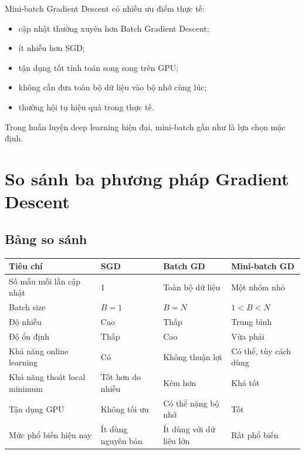 \documentclass[12pt,a4paper]{report}
\begin{document}
Mini-batch Gradient Descent có nhiều ưu điểm thực tế:

\begin{itemize}
    \item cập nhật thường xuyên hơn Batch Gradient Descent;
    \item ít nhiễu hơn SGD;
    \item tận dụng tốt tính toán song song trên GPU;
    \item không cần đưa toàn bộ dữ liệu vào bộ nhớ cùng lúc;
    \item thường hội tụ hiệu quả trong thực tế.
\end{itemize}

\begin{ghinho}
Trong huấn luyện deep learning hiện đại, mini-batch gần như là lựa chọn mặc định.
\end{ghinho}

\chapter{So sánh ba phương pháp Gradient Descent}

\section{Bảng so sánh}

\begin{center}
\begin{tabular}{p{}p{}p{}p{}}
\toprule
Tiêu chí & SGD & Batch GD & Mini-batch GD \\
\midrule
Số mẫu mỗi lần cập nhật & 1 & Toàn bộ dữ liệu & Một nhóm nhỏ \\
Batch size & $B=1$ & $B=N$ & $1<B<N$ \\
Độ nhiễu & Cao & Thấp & Trung bình \\
Độ ổn định & Thấp & Cao & Vừa phải \\
Khả năng online learning & Có & Không thuận lợi & Có thể, tùy cách dùng \\
Khả năng thoát local minimum & Tốt hơn do nhiễu & Kém hơn & Khá tốt \\
Tận dụng GPU & Không tối ưu & Có thể nặng bộ nhớ & Tốt \\
Mức phổ biến hiện nay & Ít dùng nguyên bản & Ít dùng với dữ liệu lớn & Rất phổ biến \\
\bottomrule
\end{tabular}
\end{center}
\end{document}
